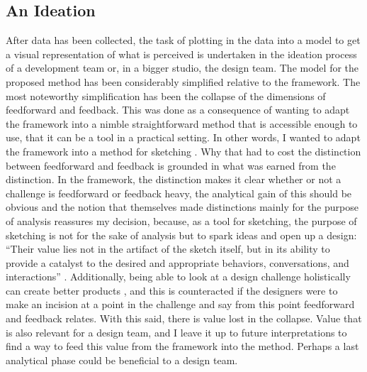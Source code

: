 \subsection{An Ideation}
After data has been collected, the task of plotting in the data into a model to get a visual representation of what is perceived is undertaken in the ideation process of a development team or, in a bigger studio, the design team. The model for the proposed method has been considerably simplified relative to the framework. The most noteworthy simplification has been the collapse of the dimensions of feedforward and feedback. This was done as a consequence of wanting to adapt the framework into a nimble straightforward method that is accessible enough to use, that it can be a tool in a practical setting. In other words, I wanted to adapt the framework into a method for sketching \cite{buxton}. Why that had to cost the distinction between feedforward and feedback is grounded in what was earned from the distinction. In the framework, the distinction makes it clear whether or not a challenge is feedforward or feedback heavy, the analytical gain of this should be obvious and the notion that  themselves made distinctions mainly for the purpose of analysis \cite[p. 5]{vermeulen} reassures my decision, because, as a tool for sketching, the purpose of sketching is not for the sake of analysis but to spark ideas and open up a design: ``Their value lies not in the artifact of the sketch itself, but in its ability to provide a catalyst to the desired and appropriate behaviors, conversations, and interactions'' \cite[p. 113]{buxton}. Additionally, being able to look at a design challenge holistically can create better products \cite{buxton}, and this is counteracted if the designers were to make an incision at a point in the challenge and say from this point feedforward and feedback relates. With this said, there is value lost in the collapse. Value that is also relevant for a design team, and I leave it up to future interpretations to find a way to feed this value from the framework into the method. Perhaps a last analytical phase could be beneficial to a design team.


